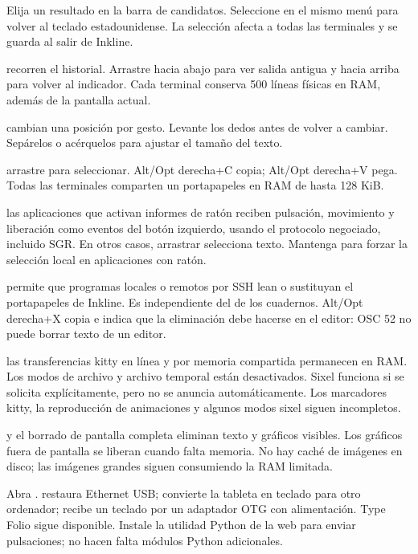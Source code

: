 Elija un resultado en la barra de candidatos. Seleccione
 en el mismo menú para volver al teclado estadounidense.
La selección afecta a todas las terminales y se guarda al salir de Inkline.

 recorren el historial. Arrastre hacia abajo para
ver salida antigua y hacia arriba para volver al indicador. Cada terminal
conserva 500 líneas físicas en RAM, además de la pantalla actual.

 cambian una posición por gesto.
Levante los dedos antes de volver a cambiar. Sepárelos o acérquelos para ajustar
el tamaño del texto.

 arrastre para seleccionar. Alt/Opt derecha+C copia;
Alt/Opt derecha+V pega. Todas las terminales comparten un portapapeles en RAM
de hasta 128 KiB.

 las aplicaciones que activan informes de ratón reciben pulsación,
movimiento y liberación como eventos del botón izquierdo, usando el protocolo
negociado, incluido SGR. En otros casos, arrastrar selecciona texto.
Mantenga  para forzar la selección local en aplicaciones con ratón.

 permite que programas locales o remotos por SSH lean o sustituyan
el portapapeles de Inkline. Es independiente del de los cuadernos.
Alt/Opt derecha+X copia e indica que la eliminación debe hacerse en el editor:
OSC 52 no puede borrar texto de un editor.

 las transferencias kitty en línea y por memoria compartida
permanecen en RAM. Los modos de archivo y archivo temporal están desactivados.
Sixel funciona si se solicita explícitamente, pero no se anuncia automáticamente.
Los marcadores kitty, la reproducción de animaciones y algunos modos sixel
siguen incompletos.

 y el borrado de pantalla completa eliminan texto y gráficos visibles.
Los gráficos fuera de pantalla se liberan cuando falta memoria. No hay caché
de imágenes en disco; las imágenes grandes siguen consumiendo la RAM limitada.

Abra .  restaura Ethernet USB;
 convierte la tableta en teclado para otro ordenador;
 recibe un teclado por un adaptador OTG con alimentación.
Type Folio sigue disponible. Instale la utilidad Python de la web para enviar
pulsaciones; no hacen falta módulos Python adicionales.

